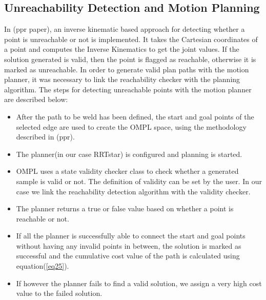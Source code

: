 \subsection{Unreachability Detection and Motion Planning}
In (ppr paper), an inverse kinematic based approach for detecting whether a point is unreachable or not is implemented. It takes the Cartesian coordinates of a point and computes the Inverse Kinematics to get the joint values. If the solution generated is valid, then the point is flagged as reachable, otherwise it is marked as unreachable. In order to generate valid plan paths with the motion planner, it was necessary to link the reachability checker with the planning algorithm. 
The steps for detecting unreachable points with the motion planner are described below:
\begin{itemize}
	\item After the path to be weld has been defined, the start and goal points of the selected edge are used to create the OMPL space, using the methodology described in (ppr).
	\item The planner(in our case RRTstar) is configured and planning is started.
	\item OMPL uses a state validity checker class to check whether a generated sample is valid or not. The definition of validity can be set by the user. In our case we link the reachability detection algorithm with the validity checker.
	\item The planner returns a true or false value based on whether a point is reachable or not.
	\item If all the planner is successfully able to connect the start and goal points without having any invalid points in between, the solution is marked as successful and the cumulative cost value of the path is calculated using equation(\ref{eq25}).
	\item If however the planner fails to find a valid solution, we assign a very high cost value to the failed solution. 
\end{itemize} 

